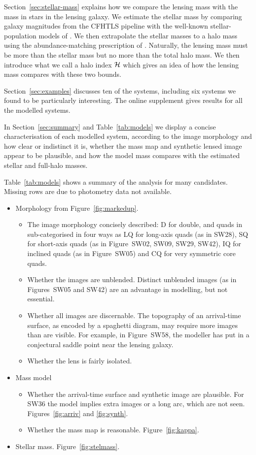 Section~\ref{sec:stellar-mass} explains how we compare the lensing
mass with the mass in stars in the lensing galaxy.  We estimate the
stellar mass by comparing galaxy magnitudes from the CFHTLS pipeline
with the well-known stellar-population models of
\cite{2003MNRAS.344.1000B}.  We then extrapolate the stellar masses to
a halo mass using the abundance-matching prescription of
\cite{2010ApJ...710..903M}.  Naturally, the lensing mass must be more
than the stellar mass but no more than the total halo mass.  We then
introduce what we call a halo index $\mathcal{H}$ which gives an idea
of how the lensing mass compares with these two bounds.

Section~\ref{sec:examples} discusses ten of the systems, including six
systems we found to be particularly interesting.  The online
supplement gives results for all the modelled systems.

In Section~\ref{sec:summary} and Table~\ref{tab:models} we display a
concise characterisation of each modelled system, according to the
image morphology and how clear or indistinct it is, whether the mass
map and synthetic lensed image appear to be plausible, and how the
model mass compares with the estimated stellar and full-halo masses.

Table~\ref{tab:models} shows a summary of the analysis for many candidates.
Missing rows are due to photometry data not available.

\begin{itemize}
\item Morphology from Figure~\ref{fig:markedup}.
\begin{itemize}
\item The image morphology concisely described: D for double, and
  quads in sub-categorised in four ways
  \citep[cf.][]{2003AJ....125.2769S} as LQ for long-axis quads (as in
  SW28), SQ for short-axis quads (as in Figure~SW02,
  SW09, SW29, SW42), IQ for inclined quads
  (as in Figure~SW05) and CQ for very symmetric core quads.
\item Whether the images are unblended.  Distinct unblended images (as
  in Figures~SW05 and SW42) are an advantage in
  modelling, but not essential.
\item Whether all images are discernable.  The topography of an
  arrival-time surface, as encoded by a spaghetti diagram, may require
  more images than are visible.  For example, in Figure~SW58,
  the modeller has put in a conjectural saddle point near the lensing
  galaxy.
\item Whether the lens is fairly isolated.
\end{itemize}
\item Mass model
\begin{itemize}
\item Whether the arrival-time surface and synthetic image are
  plausible.  For SW36 the model implies extra images or a long arc,
  which are not seen.  Figures~\ref{fig:arriv} and \ref{fig:synth}.
\item Whether the mass map is reasonable. Figure~\ref{fig:kappa}.
\end{itemize}
\item Stellar mass. Figure~\ref{fig:stelmass}.
\end{itemize}

